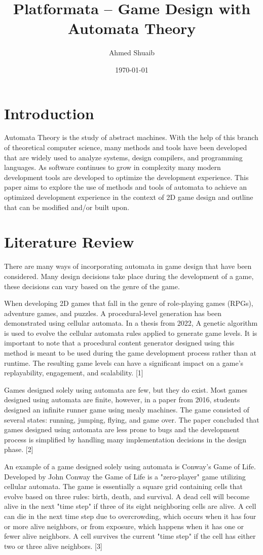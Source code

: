 \documentclass[10pt,twocolumn]{article}
\title{\vspace{-0.6in}\huge{Platformata -- Game Design with Automata Theory}}
\author{Ahmed Shuaib}
\date{\today}
\begin{document}
\maketitle
\vspace{-0.4in}

\section*{Introduction}
Automata Theory is the study of abstract machines. With the help of this branch of theoretical computer science, many methods and tools have been developed that are widely used to analyze systems, design compilers, and programming languages. As software continues to grow in complexity many modern development tools are developed to optimize the development experience. This paper aims to explore the use of methods and tools of automata to achieve an optimized development experience in the context of 2D game design and outline that can be modified and/or built upon.

\section*{Literature Review}
There are many ways of incorporating automata in game design that have been considered. Many design decisions take place during the development of a game, these decisions can vary based on the genre of the game.
\par
When developing 2D games that fall in the genre of role-playing games (RPGs), adventure games, and puzzles. A procedural-level generation has been demonstrated using cellular automata. In a thesis from 2022, A genetic algorithm is used to evolve the cellular automata rules applied to generate game levels. It is important to note that a procedural content generator designed using this method is meant to be used during the game development process rather than at runtime. The resulting game levels can have a significant impact on a game's replayability, engagement, and scalability. [1]
\par
Games designed solely using automata are few, but they do exist. Most games designed using automata are finite, however, in a paper from 2016, students designed an infinite runner game using mealy machines. The game consisted of several states: running, jumping, flying, and game over. The paper concluded that games designed using automata are less prone to bugs and the development process is simplified by handling many implementation decisions in the design phase. [2]
\par
An example of a game designed solely using automata is Conway's Game of Life. Developed by John Conway the Game of Life is a "zero-player" game utilizing cellular automata. The game is essentially a square grid containing cells that evolve based on three rules: birth, death, and survival. A dead cell will become alive in the next "time step" if three of its eight neighboring cells are alive. A cell can die in the next time step due to overcrowding, which occurs when it has four or more alive neighbors, or from exposure, which happens when it has one or fewer alive neighbors. A cell survives the current "time step" if the cell has either two or three alive neighbors. [3]
\end{document}
